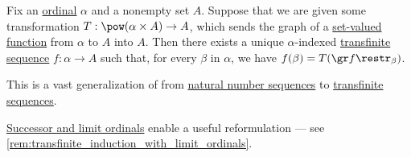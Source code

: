 \begin{theorem}\label{thm:transfinite_recursion}
  Fix an \hyperref[def:ordinal]{ordinal} \( \alpha \) and a nonempty set \( A \). Suppose that we are given some transformation \( T: \pow(\alpha \times A) \to A \), which sends the graph of a \hyperref[def:set_valued_function]{set-valued function} from \( \alpha \) to \( A \) into \( A \). Then there exists a unique \( \alpha \)-indexed \hyperref[def:transfinite_sequence]{transfinite sequence} \( f: \alpha \to A \) such that, for every \( \beta \) in \( \alpha \), we have \( f(\beta) = T(\gr f\restr_\beta) \).
\end{theorem}
\begin{comments}
  \item This is a vast generalization of  from \hyperref[def:sequence]{natural number sequences} to \hyperref[def:transfinite_sequence]{transfinite sequences}.

  \item \hyperref[def:successor_and_limit_ordinal]{Successor and limit ordinals} enable a useful reformulation --- see \cref{rem:transfinite_induction_with_limit_ordinals}.
\end{comments}
